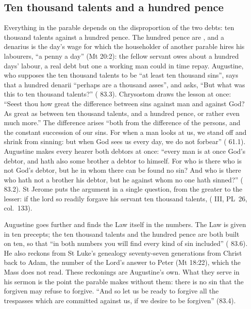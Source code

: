 \subsection{Ten thousand talents and a hundred pence}

Everything in the parable depends on the disproportion of the two debts: ten
thousand talents against a hundred pence. The hundred pence are , and a denarius is the day's wage for which the householder of another
parable hires his labourers, ``a penny a day'' (Mt 20:2): the fellow servant owes
about a hundred days' labour, a real debt but one a working man could in time
repay. Augustine, who supposes the ten thousand talents to be ``at least ten
thousand sins'', says that a hundred denarii ``perhaps are a thousand asses'',
and asks, ``But what was this to ten thousand talents?'' ( 83.3).
Chrysostom draws the lesson at once: ``Seest thou how great the difference
between sins against man and against God? As great as between ten thousand
talents, and a hundred pence, or rather even much more.'' The difference arises
``both from the difference of the persons, and the constant succession of our
sins. For when a man looks at us, we stand off and shrink from sinning: but when
God sees us every day, we do not forbear'' ( 61.1).
Augustine makes every hearer both debtors at once: ``every man is at once God's
debtor, and hath also some brother a debtor to himself. For who is there who is
not God's debtor, but he in whom there can be found no sin? And who is there who
hath not a brother his debtor, but he against whom no one hath sinned?''
( 83.2). St Jerome puts the argument in a single question, from the
greater to the lesser: if the lord so readily forgave his servant ten thousand
talents, 
( III, PL~26, col.~133).

Augustine goes further and finds the Law itself in the numbers. The Law is given
in ten precepts; the ten thousand talents and the hundred pence are both built
on ten, so that ``in both numbers you will find every kind of sin included''
( 83.6). He also reckons from St Luke's genealogy seventy-seven
generations from Christ back to Adam, the number of the Lord's answer to Peter
(Mt 18:22), which the Mass does not read. These
reckonings are Augustine's own. What they serve in his sermon is the point the
parable makes without them: there is no sin that
the forgiven may refuse to forgive. ``And so let us be ready to forgive all the
trespasses which are committed against us, if we desire to be forgiven'' (83.4).

